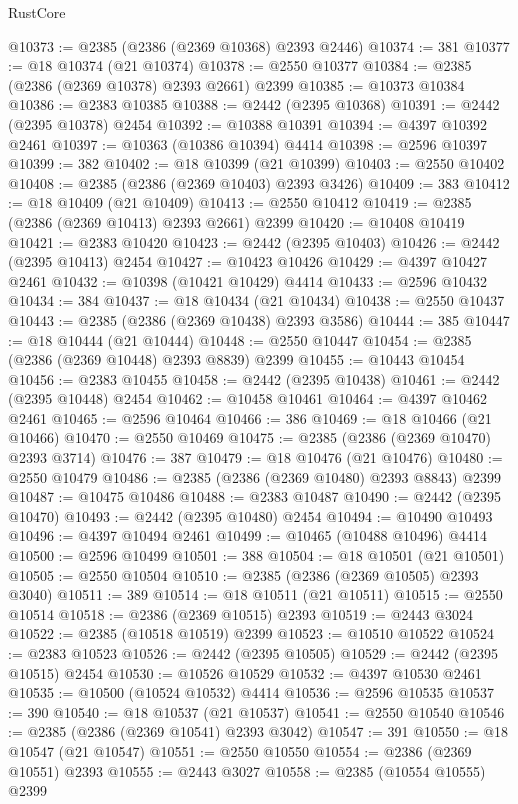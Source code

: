 \begin{lexlean}{RustCore}
\begin{coremodule}
@10373 := @2385 (@2386 (@2369 @10368) @2393 @2446)
@10374 := 381
@10377 := @18 @10374 (@21 @10374)
@10378 := @2550 @10377
@10384 := @2385 (@2386 (@2369 @10378) @2393 @2661) @2399
@10385 := @10373 @10384
@10386 := @2383 @10385
@10388 := @2442 (@2395 @10368)
@10391 := @2442 (@2395 @10378) @2454
@10392 := @10388 @10391
@10394 := @4397 @10392 @2461
@10397 := @10363 (@10386 @10394) @4414
@10398 := @2596 @10397
@10399 := 382
@10402 := @18 @10399 (@21 @10399)
@10403 := @2550 @10402
@10408 := @2385 (@2386 (@2369 @10403) @2393 @3426)
@10409 := 383
@10412 := @18 @10409 (@21 @10409)
@10413 := @2550 @10412
@10419 := @2385 (@2386 (@2369 @10413) @2393 @2661) @2399
@10420 := @10408 @10419
@10421 := @2383 @10420
@10423 := @2442 (@2395 @10403)
@10426 := @2442 (@2395 @10413) @2454
@10427 := @10423 @10426
@10429 := @4397 @10427 @2461
@10432 := @10398 (@10421 @10429) @4414
@10433 := @2596 @10432
@10434 := 384
@10437 := @18 @10434 (@21 @10434)
@10438 := @2550 @10437
@10443 := @2385 (@2386 (@2369 @10438) @2393 @3586)
@10444 := 385
@10447 := @18 @10444 (@21 @10444)
@10448 := @2550 @10447
@10454 := @2385 (@2386 (@2369 @10448) @2393 @8839) @2399
@10455 := @10443 @10454
@10456 := @2383 @10455
@10458 := @2442 (@2395 @10438)
@10461 := @2442 (@2395 @10448) @2454
@10462 := @10458 @10461
@10464 := @4397 @10462 @2461
@10465 := @2596 @10464
@10466 := 386
@10469 := @18 @10466 (@21 @10466)
@10470 := @2550 @10469
@10475 := @2385 (@2386 (@2369 @10470) @2393 @3714)
@10476 := 387
@10479 := @18 @10476 (@21 @10476)
@10480 := @2550 @10479
@10486 := @2385 (@2386 (@2369 @10480) @2393 @8843) @2399
@10487 := @10475 @10486
@10488 := @2383 @10487
@10490 := @2442 (@2395 @10470)
@10493 := @2442 (@2395 @10480) @2454
@10494 := @10490 @10493
@10496 := @4397 @10494 @2461
@10499 := @10465 (@10488 @10496) @4414
@10500 := @2596 @10499
@10501 := 388
@10504 := @18 @10501 (@21 @10501)
@10505 := @2550 @10504
@10510 := @2385 (@2386 (@2369 @10505) @2393 @3040)
@10511 := 389
@10514 := @18 @10511 (@21 @10511)
@10515 := @2550 @10514
@10518 := @2386 (@2369 @10515) @2393
@10519 := @2443 @3024
@10522 := @2385 (@10518 @10519) @2399
@10523 := @10510 @10522
@10524 := @2383 @10523
@10526 := @2442 (@2395 @10505)
@10529 := @2442 (@2395 @10515) @2454
@10530 := @10526 @10529
@10532 := @4397 @10530 @2461
@10535 := @10500 (@10524 @10532) @4414
@10536 := @2596 @10535
@10537 := 390
@10540 := @18 @10537 (@21 @10537)
@10541 := @2550 @10540
@10546 := @2385 (@2386 (@2369 @10541) @2393 @3042)
@10547 := 391
@10550 := @18 @10547 (@21 @10547)
@10551 := @2550 @10550
@10554 := @2386 (@2369 @10551) @2393
@10555 := @2443 @3027
@10558 := @2385 (@10554 @10555) @2399

\end{coremodule}
\end{lexlean}
